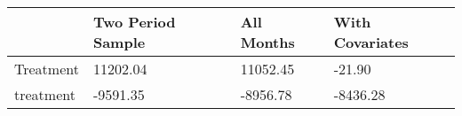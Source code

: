 \begin{tabular}{llll}
\toprule
 & Two Period Sample & All Months & With Covariates \\
\midrule
Treatment & 11202.04 & 11052.45 & -21.90 \\
treatment & -9591.35 & -8956.78 & -8436.28 \\
\bottomrule
\end{tabular}
